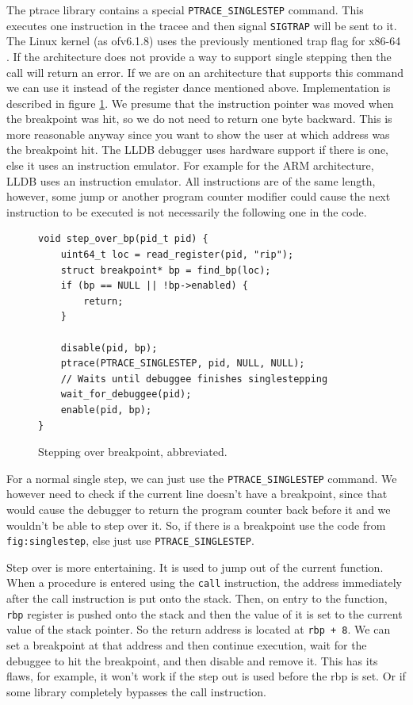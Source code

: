 The ptrace library contains a special \texttt{PTRACE\_SINGLESTEP} command. This
executes one instruction in the tracee and then signal \texttt{SIGTRAP} will be
sent to it. The Linux kernel (as ofv6.1.8) uses the previously mentioned trap
flag for x86-64 \cite{linuxkernel-trapflag}. If the architecture does not provide
a way to support single stepping then the call will return an error. If we are
on an architecture that supports this command we can use it instead of the
register dance mentioned above. Implementation is described in figure
\ref{fig:singlestep}. We presume that the instruction pointer was moved when
the breakpoint was hit, so we do not need to return one byte backward. This is
more reasonable anyway since you want to show the user at which address was the
breakpoint hit. The LLDB \cite{lldb} debugger uses hardware support if there is
one, else it uses an instruction emulator. For example for the ARM
architecture, LLDB uses an instruction emulator. All instructions are of the
same length, however, some jump or another program counter modifier could cause
the next instruction to be executed is not necessarily the following one in the
code.

\begin{figure}\label{fig:singlestep}
    \begin{verbatim}
void step_over_bp(pid_t pid) {
    uint64_t loc = read_register(pid, "rip");
    struct breakpoint* bp = find_bp(loc);
    if (bp == NULL || !bp->enabled) {
        return;
    }

    disable(pid, bp);
    ptrace(PTRACE_SINGLESTEP, pid, NULL, NULL);
    // Waits until debuggee finishes singlestepping
    wait_for_debuggee(pid);
    enable(pid, bp);
}
    \end{verbatim}
    \caption{Stepping over breakpoint, abbreviated.}
\end{figure}

For a normal single step, we can just use the \texttt{PTRACE\_SINGLESTEP}
command. We however need to check if the current line doesn't have a
breakpoint, since that would cause the debugger to return the program counter
back before it and we wouldn't be able to step over it. So, if there is a
breakpoint use the code from \texttt{fig:singlestep}, else just use
\texttt{PTRACE\_SINGLESTEP}.

Step over is more entertaining. It is used to jump out of the current function.
When a procedure is entered using the \texttt{call} instruction, the address
immediately after the call instruction is put onto the stack. Then, on entry to
the function, \texttt{rbp} register is pushed onto the stack and then the value
of it is set to the current value of the stack pointer. So the return address
is located at \texttt{rbp + 8}. We can set a breakpoint at that address and
then continue execution, wait for the debuggee to hit the breakpoint, and then
disable and remove it. This has its flaws, for example, it won't work if the
step out is used before the rbp is set. Or if some library completely bypasses
the call instruction.

